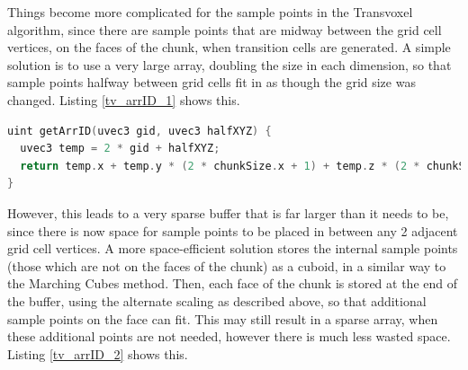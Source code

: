 \documentclass{article}
\begin{document}
Things become more complicated for the sample points in the Transvoxel algorithm, since there are sample points that are midway between the grid cell vertices, on the faces of the chunk, when transition cells are generated. A simple solution is to use a very large array, doubling the size in each dimension, so that sample points halfway between grid cells fit in as though the grid size was changed. Listing \ref{tv_arrID_1} shows this.

\begin{lstlisting}[language=C++,label={tv_arrID_1},caption={Inefficient function mapping grid position \texttt{gid} and information about whether the sample point is in between the grid positions, \texttt{halfXYZ}, to a flat array id}]
uint getArrID(uvec3 gid, uvec3 halfXYZ) {
  uvec3 temp = 2 * gid + halfXYZ;
  return temp.x + temp.y * (2 * chunkSize.x + 1) + temp.z * (2 * chunkSize.x + 1) * (2 * chunkSize.y + 1);
}
\end{lstlisting}

However, this leads to a very sparse buffer that is far larger than it needs to be, since there is now space for sample points to be placed in between any 2 adjacent grid cell vertices. A more space-efficient solution stores the internal sample points (those which are not on the faces of the chunk) as a cuboid, in a similar way to the Marching Cubes method. Then, each face of the chunk is stored at the end of the buffer, using the alternate scaling as described above, so that additional sample points on the face can fit. This may still result in a sparse array, when these additional points are not needed, however there is much less wasted space. Listing \ref{tv_arrID_2} shows this.
\end{document}
